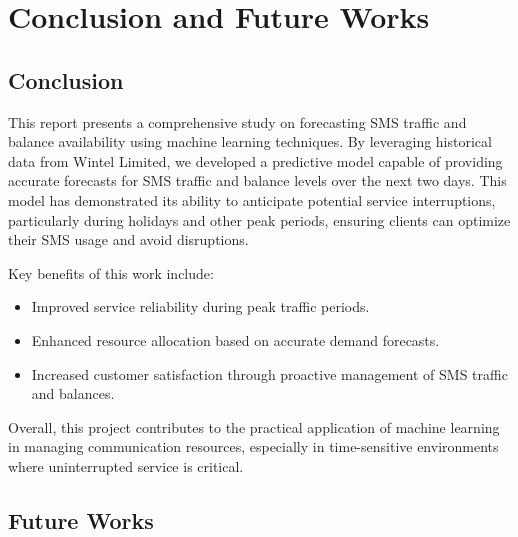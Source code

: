 \documentclass[12pt]{book} %
\begin{document}
\chapter{Conclusion and Future Works}










\section{Conclusion}

This report presents a comprehensive study on forecasting SMS traffic and balance availability using machine learning techniques. By leveraging historical data from Wintel Limited, we developed a predictive model capable of providing accurate forecasts for SMS traffic and balance levels over the next two days. This model has demonstrated its ability to anticipate potential service interruptions, particularly during holidays and other peak periods, ensuring clients can optimize their SMS usage and avoid disruptions.

Key benefits of this work include:

\begin{itemize}
    \item Improved service reliability during peak traffic periods.
    \item Enhanced resource allocation based on accurate demand forecasts.
    \item Increased customer satisfaction through proactive management of SMS traffic and balances.
\end{itemize}

Overall, this project contributes to the practical application of machine learning in managing communication resources, especially in time-sensitive environments where uninterrupted service is critical.


\section{Future Works}
\end{document}
